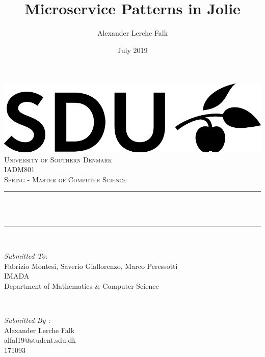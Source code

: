 \documentclass[12pt]{article}
\title{Microservice Patterns in Jolie}						%
\author{Alexander Lerche Falk}				      			%
\date{July 2019}											%
\makeatletter
\let\thetitle\@title
\makeatother
\begin{document}

\begin{titlepage}
	\centering
    \vspace*{0.5 cm}
    \includegraphics[scale = 0.75]{SDU_logo.png}\\[1.0 cm]	%
    \textsc{\LARGE University of Southern Denmark}\\[2.0 cm]	%
    \textsc{\Large IADM801}\\[0.5 cm]				%
    \textsc{\Large Spring - Master of Computer Science}\\[0.5 cm]	%
	\rule{\linewidth}{0.2 mm} \\[0.4 cm]
	{ \huge \bfseries \thetitle}\\
	\rule{\linewidth}{0.2 mm} \\[1.5 cm]
	
	\begin{minipage}{0.4\textwidth}
		\begin{flushleft} \large
			\emph{Submitted To:}\\
			Fabrizio Montesi, Saverio Giallorenzo, Marco Peressotti\\
			IMADA \\
			Department of Mathematics \& Computer Science \\
			\end{flushleft}
			\end{minipage}~
			\begin{minipage}{0.4\textwidth}
            
			\begin{flushright} \large
			\emph{Submitted By :} \\
            Alexander Lerche Falk\\
            alfal19@student.sdu.dk\\
            171093\\
            \end{flushright}
        
	\end{minipage}\\[2 cm]
    
	
\end{titlepage}
\end{document}
